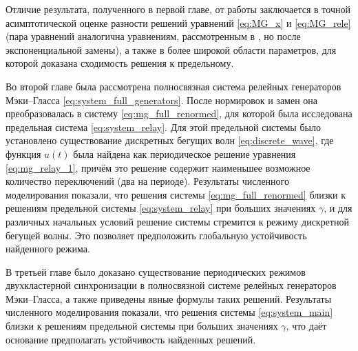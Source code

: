 Отличие результата, полученного в первой главе, от работы \cite{Bartha2021} заключается в точной асимптотической оценке разности решений уравнений \eqref{eq:MG_x} и \eqref{eq:MG_rele} (пара уравнений аналогична уравнениям, рассмотренным в \cite{Bartha2021, Krisztin2020}, но после экспоненциальной замены), а также в более широкой области параметров, для которой доказана сходимость решения к предельному.

Во второй главе была рассмотрена полносвязная система релейных генераторов Мэки--Гласса \eqref{eq:system_full_generators}. После нормировок и замен она преобразовалась в систему \eqref{eq:mg_full_renormed}, для которой была исследована предельная система \eqref{eq:system_relay}. Для этой предельной системы было установлено существование дискретных бегущих волн \eqref{eq:discrete_wave}, где функция $u(t)$ была найдена как периодическое решение уравнения \eqref{eq:mg_relay_1}, причём это решение содержит наименьшее возможное количество переключений (два на периоде). Результаты численного моделирования показали, что решения системы \eqref{eq:mg_full_renormed} близки к решениям предельной системы \eqref{eq:system_relay} при больших значениях $\gamma$, и для различных начальных условий решение системы стремится к режиму дискретной бегущей волны. Это позволяет предположить глобальную устойчивость найденного режима.

В третьей главе было доказано существование периодических режимов двухкластерной синхронизации в полносвязной системе релейных генераторов Мэки--Гласса, а также приведены явные формулы таких решений. Результаты численного моделирования показали, что решения системы \eqref{eq:system_main} близки к решениям предельной системы при больших значениях $\gamma$, что даёт основание предполагать устойчивость найденных решений.





